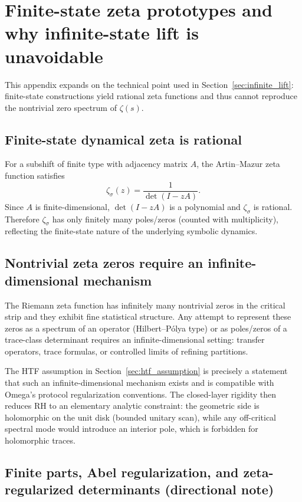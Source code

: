 
\section{Finite-state zeta prototypes and why infinite-state lift is unavoidable}
\label{app:finite_state_infinite_lift}

This appendix expands on the technical point used in Section~\ref{sec:infinite_lift}: finite-state constructions yield rational zeta functions and thus cannot reproduce the nontrivial zero spectrum of $\zeta(s)$.

\subsection{Finite-state dynamical zeta is rational}
\label{app:sft_rational}

For a subshift of finite type with adjacency matrix $A$, the Artin--Mazur zeta function satisfies
\[
\zeta_{\sigma}(z)=\frac{1}{\det(I-zA)}.
\]
Since $A$ is finite-dimensional, $\det(I-zA)$ is a polynomial and $\zeta_\sigma$ is rational.
Therefore $\zeta_\sigma$ has only finitely many poles/zeros (counted with multiplicity), reflecting the finite-state nature of the underlying symbolic dynamics.

\subsection{Nontrivial zeta zeros require an infinite-dimensional mechanism}
\label{app:need_infinite}

The Riemann zeta function has infinitely many nontrivial zeros in the critical strip and they exhibit fine statistical structure.
Any attempt to represent these zeros as a spectrum of an operator (Hilbert--P\'olya type) or as poles/zeros of a trace-class determinant requires an infinite-dimensional setting: transfer operators, trace formulas, or controlled limits of refining partitions.

The HTF assumption in Section~\ref{sec:htf_assumption} is precisely a statement that such an infinite-dimensional mechanism exists and is compatible with Omega's protocol regularization conventions.
The closed-layer rigidity then reduces RH to an elementary analytic constraint: the geometric side is holomorphic on the unit disk (bounded unitary scan), while any off-critical spectral mode would introduce an interior pole, which is forbidden for holomorphic traces.

\subsection{Finite parts, Abel regularization, and zeta-regularized determinants (directional note)}
\label{app:finite_part_vs_zeta_reg}

